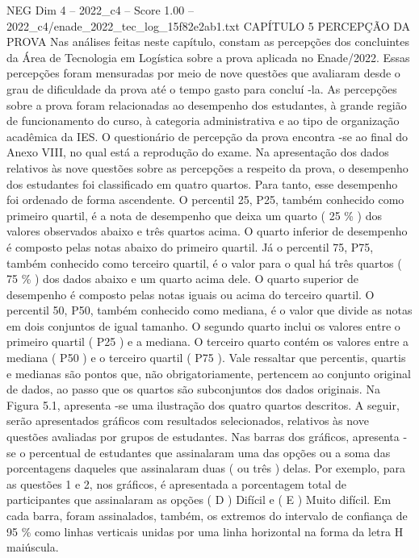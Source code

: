 \begin{textsample}{NEG Dim 4 – 2022\_c4 – Score 1.00 – 2022\_c4/enade\_2022\_tec\_log\_15f82e2ab1.txt}  \label{ex:f4_neg_213}
CAPÍTULO 5 PERCEPÇÃO DA PROVA Nas análises feitas neste capítulo, constam as percepções dos concluintes da Área de Tecnologia em Logística sobre a prova aplicada no Enade/2022.
Essas percepções foram mensuradas por meio de nove questões que avaliaram desde o grau de dificuldade da prova até o tempo gasto para concluí -la.
As percepções sobre a prova foram relacionadas ao desempenho dos estudantes, à grande região de funcionamento do curso, à categoria administrativa e ao tipo de organização acadêmica da IES.
O questionário de percepção da prova encontra -se ao final do Anexo VIII, no qual está a reprodução do exame.
Na apresentação dos dados relativos às nove questões sobre as percepções a respeito da prova, o desempenho dos estudantes foi classificado em quatro quartos.
Para tanto, esse desempenho foi ordenado de forma ascendente.
O percentil 25, P25, também conhecido como primeiro quartil, é a nota de desempenho que deixa um quarto ( 25 \% ) dos valores observados abaixo e três quartos acima.
O quarto inferior de desempenho é composto pelas notas abaixo do primeiro quartil.
Já o percentil 75, P75, também conhecido como terceiro quartil, é o valor para o qual há três quartos ( 75 \% ) dos dados abaixo e um quarto acima dele.
O quarto superior de desempenho é composto pelas notas iguais ou acima do terceiro quartil.
O percentil 50, P50, também conhecido como mediana, é o valor que divide as notas em dois conjuntos de igual tamanho.
O segundo quarto inclui os valores entre o primeiro quartil ( P25 ) e a mediana.
O terceiro quarto contém os valores entre a mediana ( P50 ) e o terceiro quartil ( P75 ).
Vale ressaltar que percentis, quartis e medianas são pontos que, não obrigatoriamente, pertencem ao conjunto original de dados, ao passo que os quartos são subconjuntos dos dados originais.
Na Figura 5.1, apresenta -se uma ilustração dos quatro quartos descritos.
A seguir, serão apresentados gráficos com resultados selecionados, relativos às nove questões avaliadas por grupos de estudantes.
Nas barras dos gráficos, apresenta -se o percentual de estudantes que assinalaram uma das opções ou a soma das porcentagens daqueles que assinalaram duas ( ou três ) delas.
Por exemplo, para as questões 1 e 2, nos gráficos, é apresentada a porcentagem total de participantes que assinalaram as opções ( D ) Difícil e ( E ) Muito difícil.
Em cada barra, foram assinalados, também, os extremos do intervalo de confiança de 95 \% como linhas verticais unidas por uma linha horizontal na forma da letra H maiúscula.

\end{textsample}
